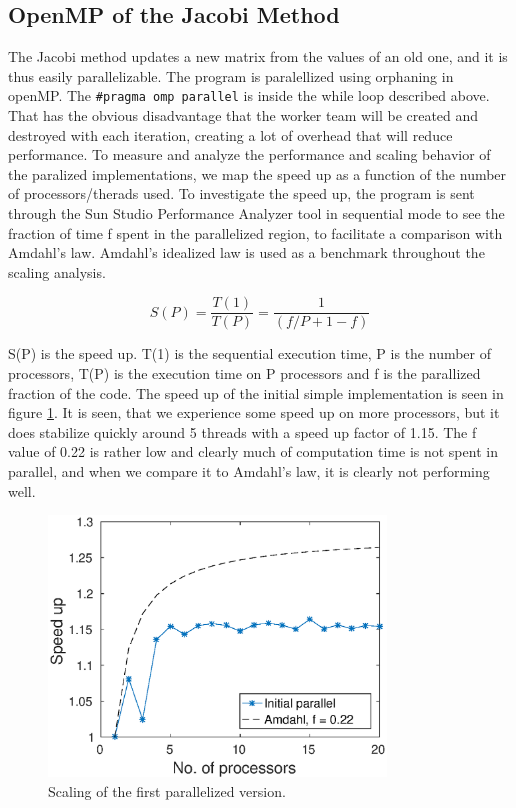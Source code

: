 \subsection{OpenMP of the Jacobi Method}
The Jacobi method updates a new matrix from the values of an old one, and it is thus easily parallelizable. The program is paralellized using orphaning in openMP. The \texttt{\#pragma omp parallel} is inside the while loop described above. That has the obvious disadvantage that the worker team will be created and destroyed with each iteration, creating a lot of overhead that will reduce performance. To measure and analyze the performance and scaling behavior of the paralized implementations, we map the speed up as a function of the number of processors/therads used. To investigate the speed up, the program is sent through the Sun Studio Performance Analyzer tool in sequential mode to see the fraction of time f spent in the parallelized region, to facilitate a comparison with Amdahl's law. Amdahl's idealized law is used as a benchmark throughout the scaling analysis.

\begin{equation}
S(P)=\dfrac{T(1)}{T(P)}=\dfrac{1}{(f/P+1-f)}
\end{equation}

S(P) is the speed up. T(1) is the sequential execution time, P is the number of processors, T(P) is the execution time on P processors and f is the parallized fraction of the code. 
The speed up of the initial simple implementation is seen in figure \ref{fig:omp_scale1}. It is seen, that we experience some speed up on more processors, but it does stabilize quickly around 5 threads with a speed up factor of 1.15. The f value of 0.22 is rather low and clearly much of computation time is not spent in parallel, and when we compare it to Amdahl's law, it is clearly not performing well.

\begin{figure}[h!]
\centering
\includegraphics[width = 0.8\textwidth]{fig/speedup_omp.eps}
\caption{Scaling of the first parallelized version.}
\label{fig:omp_scale1}
\end{figure}

